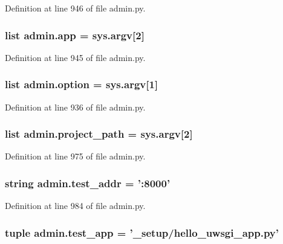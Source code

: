 Definition at line 946 of file admin.\-py.

\hypertarget{namespaceadmin_a88f927a5e67d8ccf759fd256f58a9411}{
\subsubsection[{app}]{\setlength{\rightskip}{0pt plus 5cm}list admin.\-app = sys.\-argv\mbox{[}2\mbox{]}}}\label{namespaceadmin_a88f927a5e67d8ccf759fd256f58a9411}


Definition at line 945 of file admin.\-py.

\hypertarget{namespaceadmin_a5ed72260a120fc91cfd491f424eeb883}{
\subsubsection[{option}]{\setlength{\rightskip}{0pt plus 5cm}list admin.\-option = sys.\-argv\mbox{[}1\mbox{]}}}\label{namespaceadmin_a5ed72260a120fc91cfd491f424eeb883}


Definition at line 936 of file admin.\-py.

\hypertarget{namespaceadmin_a311ce11d8285f485768151b9d757e478}{
\subsubsection[{project\-\_\-path}]{\setlength{\rightskip}{0pt plus 5cm}list admin.\-project\-\_\-path = sys.\-argv\mbox{[}2\mbox{]}}}\label{namespaceadmin_a311ce11d8285f485768151b9d757e478}


Definition at line 975 of file admin.\-py.

\hypertarget{namespaceadmin_a48db396eb86a22a960bba5ce65c12651}{
\subsubsection[{test\-\_\-addr}]{\setlength{\rightskip}{0pt plus 5cm}string admin.\-test\-\_\-addr = '\-:8000'}}\label{namespaceadmin_a48db396eb86a22a960bba5ce65c12651}


Definition at line 984 of file admin.\-py.

\hypertarget{namespaceadmin_a86733f8848ca96c56cf7c51370ebc7bd}{
\subsubsection[{test\-\_\-app}]{\setlength{\rightskip}{0pt plus 5cm}tuple admin.\-test\-\_\-app = '{\bf \-\_\-setup}/hello\-\_\-uwsgi\-\_\-app.\-py'}}\label{namespaceadmin_a86733f8848ca96c56cf7c51370ebc7bd}


